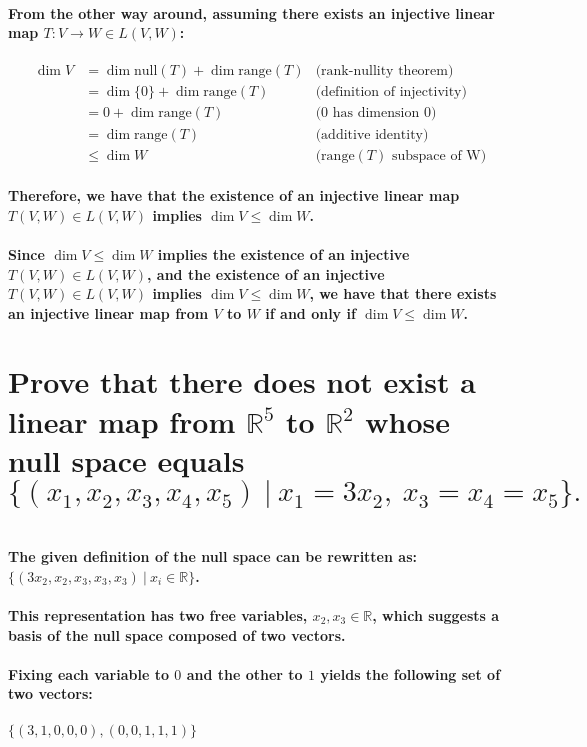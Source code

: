 \documentclass{article}
\begin{document}
\paragraph{\large
From the other way around, assuming there exists an injective linear map $T: V \rightarrow W \in L(V, W)$:}

\begin{align*}
    \dim V &= \dim \mathrm{null}(T) + \dim \mathrm{range}(T) & \text{(rank-nullity theorem)}\\
    &= \dim \{0\} + \dim \mathrm{range}(T) & \text{(definition of injectivity)}\\
    &= 0 + \dim \mathrm{range}(T) & \text{(0 has dimension 0)}\\
    &= \dim \mathrm{range}(T) & \text{(additive identity)}\\
    &\leq \dim W & \text{($\mathrm{range}(T)$ subspace of W)}
\end{align*}

\paragraph{\large
Therefore, we have that the existence of an injective linear map $T(V, W) \in L(V, W)$ implies $\dim V \leq \dim W$.}

\paragraph{\large
Since $\dim V \leq \dim W$ implies the existence of an injective $T(V, W) \in L(V, W)$, and the existence of an injective $T(V, W) \in L(V, W)$ implies $\dim V \leq \dim W$, we have that there exists an injective linear map from $V$ to $W$ if and only if $\dim V \leq \dim W$.}

\newpage

\section{Prove that there does not exist a linear map from $\mathbb{R}^5$ to $\mathbb{R}^2$ whose null space equals
$$
\{(x_1,x_2,x_3,x_4,x_5)\ |\ x_1 = 3 x_2,\ x_3 = x_4 = x_5\}.
$$}

\paragraph{\large
\\The given definition of the null space can be rewritten as:
\\ $\{(3x_2,x_2,x_3,x_3,x_3)\ |\ x_i \in \mathbb{R}\}$.
\\\\
This representation has two free variables, $x_2, x_3 \in \mathbb{R}$, which suggests a basis of the null space composed of two vectors.
\\\\
Fixing each variable to $0$ and the other to $1$ yields the following set of two vectors:
\\\\
$\{(3, 1, 0, 0, 0), (0, 0, 1, 1, 1)\}$}
\end{document}
